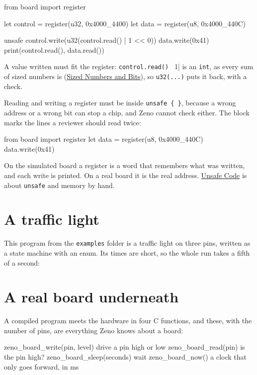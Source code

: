\begin{zeno}
from board import register

let control = register(u32, 0x4000_4400)
let data = register(u8, 0x4000_440C)

unsafe {
    control.write(u32(control.read() | 1 << 0))
    data.write(0x41)
    print(control.read(), data.read())
}
\end{zeno}

A value written must fit the register: \verb|control.read() | 1| is an
\verb|int|, as every sum of sized numbers is
(\hyperref[ch-sized-numbers]{Sized Numbers and Bits}), so
\verb|u32(...)| puts it back, with a check.

Reading and writing a register must be inside \verb|unsafe { }|,
because a wrong address or a wrong bit can stop a chip, and Zeno
cannot check either. The block marks the lines a reviewer should read
twice:

\begin{zeno}[fails=yes]
from board import register
let data = register(u8, 0x4000_440C)
data.write(0x41)
\end{zeno}

On the simulated board a register is a word that remembers what was
written, and each write is printed. On a real board it is the real
address. \hyperref[ch-unsafe]{Unsafe Code} is about \verb|unsafe| and
memory by hand.

\section{A traffic light}

This program from the \verb|examples| folder is a traffic light on
three pins, written as a state machine with an enum. Its times are
short, so the whole run takes a fifth of a second:

\begin{zeno}[src=examples/signal.zeno]
\end{zeno}

\section{A real board underneath}

A compiled program meets the hardware in four C functions, and these,
with the number of pins, are everything Zeno knows about a board:

\begin{zenofrag}[lang=shell]
zeno_board_write(pin, level)   drive a pin high or low
zeno_board_read(pin)           is the pin high?
zeno_board_sleep(seconds)      wait
zeno_board_now()               a clock that only goes forward, in ms
\end{zenofrag}

